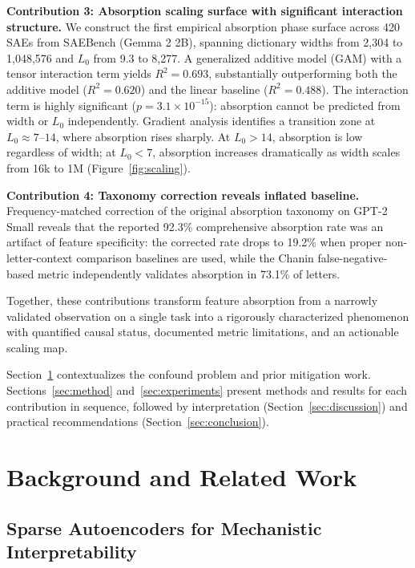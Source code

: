 \documentclass{article}
\begin{document}
\textbf{Contribution 3: Absorption scaling surface with significant interaction structure.}
We construct the first empirical absorption phase surface across 420 SAEs from SAEBench (Gemma 2 2B), spanning dictionary widths from 2,304 to 1,048,576 and $L_0$ from 9.3 to 8,277.
A generalized additive model (GAM) with a tensor interaction term yields $R^2 = 0.693$, substantially outperforming both the additive model ($R^2 = 0.620$) and the linear baseline ($R^2 = 0.488$).
The interaction term is highly significant ($p = 3.1 \times 10^{-15}$): absorption cannot be predicted from width or $L_0$ independently.
Gradient analysis identifies a transition zone at $L_0 \approx 7$--$14$, where absorption rises sharply.
At $L_0 > 14$, absorption is low regardless of width; at $L_0 < 7$, absorption increases dramatically as width scales from 16k to 1M (Figure~\ref{fig:scaling}).

\textbf{Contribution 4: Taxonomy correction reveals inflated baseline.}
Frequency-matched correction of the original \citet{chanin2024absorption} absorption taxonomy on GPT-2 Small reveals that the reported 92.3\% comprehensive absorption rate was an artifact of feature specificity: the corrected rate drops to 19.2\% when proper non-letter-context comparison baselines are used, while the Chanin false-negative-based metric independently validates absorption in 73.1\% of letters.

Together, these contributions transform feature absorption from a narrowly validated observation on a single task into a rigorously characterized phenomenon with quantified causal status, documented metric limitations, and an actionable scaling map.

Section~\ref{sec:background} contextualizes the confound problem and prior mitigation work.
Sections~\ref{sec:method} and~\ref{sec:experiments} present methods and results for each contribution in sequence, followed by interpretation (Section~\ref{sec:discussion}) and practical recommendations (Section~\ref{sec:conclusion}).

\section{Background and Related Work}
\label{sec:background}

\subsection{Sparse Autoencoders for Mechanistic Interpretability}
\end{document}
